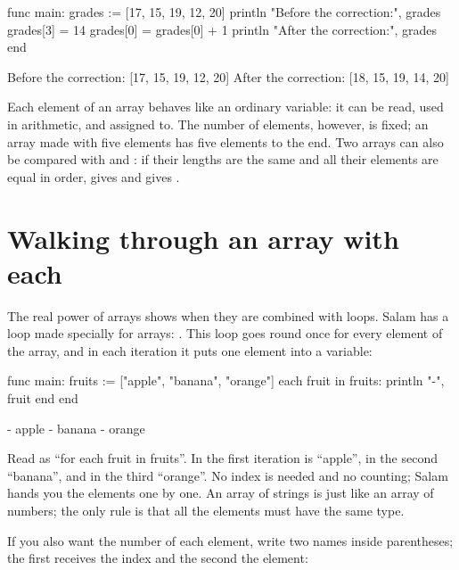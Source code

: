\begin{salamcode}
func main:
    grades := [17, 15, 19, 12, 20]
    println "Before the correction:", grades
    grades[3] = 14
    grades[0] = grades[0] + 1
    println "After the correction:", grades
end
\end{salamcode}

\begin{salamout}
Before the correction: [17, 15, 19, 12, 20]
After the correction: [18, 15, 19, 14, 20]
\end{salamout}

Each element of an array behaves like an ordinary variable: it can be read,
used in arithmetic, and assigned to. The number of elements, however, is
fixed; an array made with five elements has five elements to the end. Two
arrays can also be compared with \code{==} and \code{!=}: if their lengths
are the same and all their elements are equal in order, \code{==} gives
 and \code{!=} gives .

\section{Walking through an array with each}

The real power of arrays shows when they are combined with loops. Salam has
a loop made specially for arrays: . This loop goes round once for
every element of the array, and in each iteration it puts one element into
a variable:

\begin{salamcode}
func main:
    fruits := ["apple", "banana", "orange"]
    each fruit in fruits:
        println "-", fruit
    end
end
\end{salamcode}

\begin{salamout}
- apple
- banana
- orange
\end{salamout}

Read  as ``for each fruit in fruits''. In the
first iteration  is ``apple'', in the second ``banana'', and in
the third ``orange''. No index is needed and no counting; Salam hands you
the elements one by one. An array of strings is just like an array of
numbers; the only rule is that all the elements must have the same type.

If you also want the number of each element, write two names inside
parentheses; the first receives the index and the second the element:

